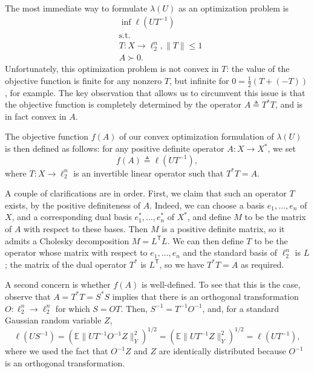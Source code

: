 \documentclass[11pt]{article}
\newcommand{\E}{\mathbb{E}}
\newcommand{\T}{\mathsf T}
\newcommand{\eqdef}{\triangleq}
\begin{document}
The most immediate way to formulate $\lambda(U)$ as an optimization
problem is 
\begin{align*}
  &\inf %
  \ell(UT^{-1})\\
  &\text{s.t.}\\
  &T:X \to\ell_2^n,\|T\| \le 1\\
  &A \succ 0.
\end{align*}
Unfortunately, this optimization problem is not convex in $T$: the
value of the objective function is finite for any nonzero $T$, but
infinite for $0 = \frac12(T + (-T))$, for example. The key observation
that allows us to circumvent this issue is that the objective function
is completely determined by the operator $A \eqdef T^*T$, and is in
fact convex in $A$. 


The objective function $f(A)$ of our convex optimization formulation of
$\lambda(U)$ is then defined as follows: for any positive definite
operator $A:X \to X^*$, we set
\begin{equation}
  \label{eq:obj-def}
  f(A) \eqdef \ell(UT^{-1}),
\end{equation}
where $T:X \to \ell_2^n$ is an invertible linear operator such that $T^*T = A$. 

A couple of clarifications are in order. First, we claim that such an
operator $T$ exists, by the positive definiteness of $A$. Indeed, we
can choose a basis $e_1, \ldots, e_n$ of $X$, and a corresponding dual
basis $e_1^*, \ldots, e_n^*$ of $X^*$, and define $M$ to be the matrix
of $A$ with respect to these bases. Then $M$ is a positive definite
matrix, so it admits a Cholesky decomposition $M = L^\T L$. We can
then define $T$ to be the operator whose matrix with respect to $e_1,
\ldots, e_n$ and the standard basis of $\ell_2^n$ is $L$; the matrix
of the dual operator $T^*$ is $L^\T$, so we have $T^*T = A$ as required.

A second concern is whether $f(A)$ is well-defined. To see that this
is the case, observe that $A = T^*T = S^*S$ implies that there is an
orthogonal transformation $O:\ell_2^n \to \ell_2^n$ for which $S =
OT$.  Then, $S^{-1} = T^{-1}O^{-1}$, and, for a standard Gaussian
random variable $Z$,
\[
\ell(US^{-1}) = (\E\|UT^{-1}O^{-1}Z\|_Y^2)^{1/2} =
(\E\|UT^{-1}Z\|_Y^2)^{1/2}
= \ell(UT^{-1}),
\]
where we used the fact that $O^{-1}Z$ and $Z$ are identically
distributed because $O^{-1}$ is an orthogonal transformation. 
\end{document}

